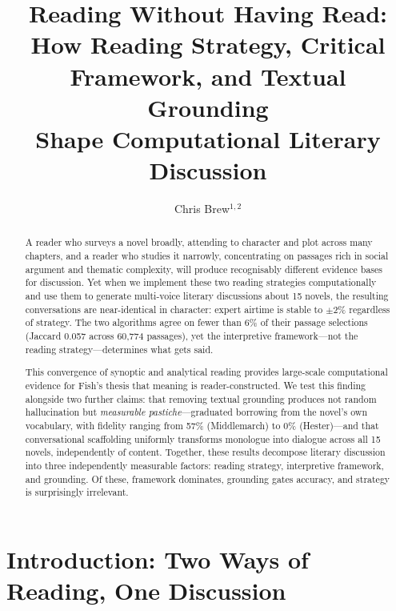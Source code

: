 \documentclass[final]{clv2025}
\begin{document}
\title{Reading Without Having Read:\\
How Reading Strategy, Critical Framework, and Textual Grounding\\
Shape Computational Literary Discussion}

\author{Chris Brew$^{1,2}$}


\maketitle

\begin{abstract}
A reader who surveys a novel broadly, attending to character and
plot across many chapters, and a reader who studies it narrowly,
concentrating on passages rich in social argument and thematic
complexity, will produce recognisably different evidence bases for
discussion.  Yet when we implement these two reading strategies
computationally and use them to generate multi-voice literary
discussions about 15 novels, the resulting conversations are
near-identical in character: expert airtime is stable to $\pm$2\%
regardless of strategy.  The two algorithms agree on fewer than 6\% of
their passage selections (Jaccard 0.057 across 60,774 passages), yet
the interpretive framework---not the reading strategy---determines
what gets said.

This convergence of synoptic and analytical reading provides
large-scale computational evidence for Fish's thesis that meaning is
reader-constructed.  We test this finding alongside two further claims:
that removing textual grounding produces not random hallucination but
\emph{measurable pastiche}---graduated borrowing from the novel's own
vocabulary, with fidelity ranging from 57\% (Middlemarch) to 0\%
(Hester)---and that conversational scaffolding uniformly transforms
monologue into dialogue across all 15 novels, independently of content.
Together, these results decompose literary discussion into three
independently measurable factors: reading strategy, interpretive
framework, and grounding.  Of these, framework dominates, grounding
gates accuracy, and strategy is surprisingly irrelevant.
\end{abstract}

\section{Introduction: Two Ways of Reading, One Discussion}
\label{sec:intro}
\end{document}
